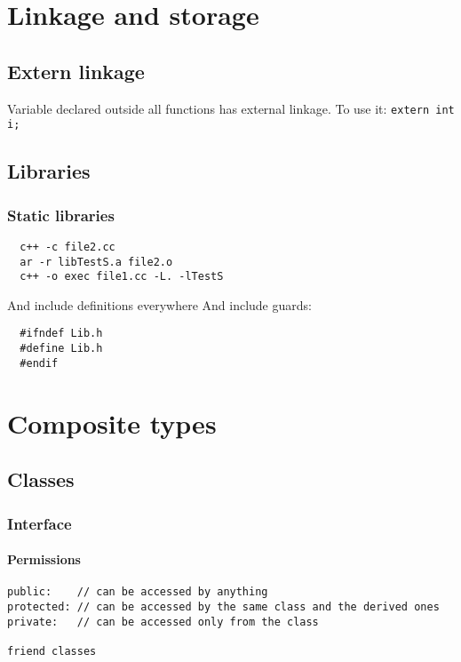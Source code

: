 \documentclass{article}
\begin{document}
\section{Linkage and storage}
\subsection{Extern linkage}
Variable declared outside all functions has external linkage.
To use it: \texttt{extern int i;}
\subsection{Libraries}
\subsubsection{Static libraries}
\begin{lstlisting}
  c++ -c file2.cc
  ar -r libTestS.a file2.o
  c++ -o exec file1.cc -L. -lTestS
\end{lstlisting}
And include definitions everywhere %
And include guards:
\begin{lstlisting}
  #ifndef Lib.h
  #define Lib.h
  #endif
\end{lstlisting}




\section{Composite types}
\subsection{Classes}
\subsubsection{Interface}
\paragraph{Permissions}
\begin{lstlisting}
public:    // can be accessed by anything
protected: // can be accessed by the same class and the derived ones
private:   // can be accessed only from the class

friend classes
\end{lstlisting}
\end{document}
